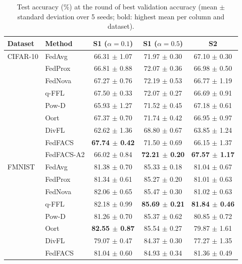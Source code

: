 
\begin{table}[!htbp]
\centering\footnotesize\setlength{\tabcolsep}{3pt}\renewcommand{\arraystretch}{1.08}
\caption{Test accuracy (\%) at the round of best validation accuracy (mean $\pm$ standard deviation over 5 seeds; bold: highest mean per column and dataset).}
\label{tab:main_acc}
\begin{tabular*}{\journalfloatwidth}{@{\extracolsep{\fill}}llccc@{}}
\toprule
Dataset & Method & S1 ($\alpha=0.1$) & S1 ($\alpha=0.5$) & S2 \\
\midrule
CIFAR-10 & FedAvg & 66.31 $\pm$ 1.07 & 71.97 $\pm$ 0.30 & 67.10 $\pm$ 0.30 \\
 & FedProx & 66.81 $\pm$ 0.88 & 72.07 $\pm$ 0.36 & 66.98 $\pm$ 0.50 \\
 & FedNova & 67.27 $\pm$ 0.76 & 72.19 $\pm$ 0.53 & 66.77 $\pm$ 1.19 \\
 & q-FFL & 67.50 $\pm$ 0.33 & 72.07 $\pm$ 0.27 & 66.69 $\pm$ 0.91 \\
 & Pow-D & 65.93 $\pm$ 1.27 & 71.52 $\pm$ 0.45 & 67.18 $\pm$ 0.61 \\
 & Oort & 67.37 $\pm$ 0.70 & 71.74 $\pm$ 0.42 & 66.95 $\pm$ 0.97 \\
 & DivFL & 62.62 $\pm$ 1.36 & 68.80 $\pm$ 0.67 & 63.85 $\pm$ 1.24 \\
 & FedFACS & \textbf{67.74 $\pm$ 0.42} & 71.50 $\pm$ 0.69 & 66.15 $\pm$ 1.37 \\
 & FedFACS-A2 & 66.02 $\pm$ 0.84 & \textbf{72.21 $\pm$ 0.20} & \textbf{67.57 $\pm$ 1.17} \\
\midrule
FMNIST & FedAvg & 81.38 $\pm$ 0.70 & 85.33 $\pm$ 0.18 & 81.04 $\pm$ 0.67 \\
 & FedProx & 81.34 $\pm$ 0.61 & 85.27 $\pm$ 0.20 & 81.01 $\pm$ 0.63 \\
 & FedNova & 82.06 $\pm$ 0.65 & 85.47 $\pm$ 0.30 & 81.02 $\pm$ 0.63 \\
 & q-FFL & 82.18 $\pm$ 0.99 & \textbf{85.69 $\pm$ 0.21} & \textbf{81.84 $\pm$ 0.46} \\
 & Pow-D & 81.26 $\pm$ 0.70 & 85.37 $\pm$ 0.62 & 80.85 $\pm$ 0.72 \\
 & Oort & \textbf{82.55 $\pm$ 0.87} & 85.54 $\pm$ 0.27 & 79.87 $\pm$ 1.61 \\
 & DivFL & 79.07 $\pm$ 0.47 & 84.37 $\pm$ 0.30 & 77.27 $\pm$ 1.35 \\
 & FedFACS & 81.04 $\pm$ 0.60 & 84.93 $\pm$ 0.34 & 81.36 $\pm$ 0.49 \\

\end{tabular*}
\end{table}
